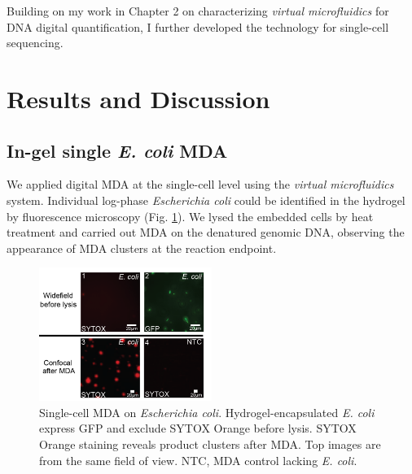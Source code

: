 Building on my work in Chapter 2 on characterizing \textit{virtual microfluidics} for DNA digital quantification, I further developed the technology for single-cell sequencing. 

\section{Results and Discussion}
\subsection{In-gel single \textit{E. coli} MDA}
We applied digital MDA at the single-cell level using the \textit{virtual microfluidics} system. Individual log-phase \textit{Escherichia coli} could be identified in the hydrogel by fluorescence microscopy (Fig. \ref{fig:EcoliMDA}). We lysed the embedded cells by heat treatment and carried out MDA on the denatured genomic DNA, observing the appearance of MDA clusters at the reaction endpoint.

\begin{figure}
\centering
\includegraphics[keepaspectratio,width=0.5\textwidth]{./figures/Thesis-22.png}
\caption[Single-cell MDA on \textit{Escherichia coli}]{Single-cell MDA on \textit{Escherichia coli}. Hydrogel-encapsulated \textit{E. coli}  express GFP and exclude SYTOX Orange before lysis. SYTOX Orange staining reveals product clusters after MDA. Top images are from the same field of view. NTC, MDA control lacking \textit{E. coli}.}
\label{fig:EcoliMDA}
\end{figure}


